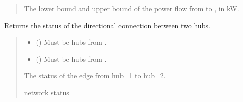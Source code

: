 \documentclass[letterpaper,10pt,english]{sphinxmanual}
\begin{document}
\begin{fulllineitems}
\begin{fulllineitems}
\begin{quote}
\begin{description}
\sphinxAtStartPar
The lower bound and upper bound of the power flow from  to , in kW.

\end{description}\end{quote}

\end{fulllineitems}


\begin{fulllineitems}
\label{\detokenize{generated/tamos.network.ThermalNetwork:tamos.network.ThermalNetwork.get_connection_status}}
\pysigstartsignatures
{}
\pysigstopsignatures
\sphinxAtStartPar
Returns the status of the directional connection between two hubs.
\begin{quote}\begin{description}
\begin{itemize}
\item {} 
\sphinxAtStartPar
{} ({\hyperref[\detokenize{generated/tamos.Hub:tamos.Hub}]{}}) \textendash{} Must be hubs from .

\item {} 
\sphinxAtStartPar
{} ({\hyperref[\detokenize{generated/tamos.Hub:tamos.Hub}]{}}) \textendash{} Must be hubs from .

\end{itemize}

\sphinxAtStartPar
The status of the edge from hub\_1 to hub\_2.

\sphinxAtStartPar
network status

\end{description}\end{quote}

\end{fulllineitems}



\end{fulllineitems}
\end{document}
